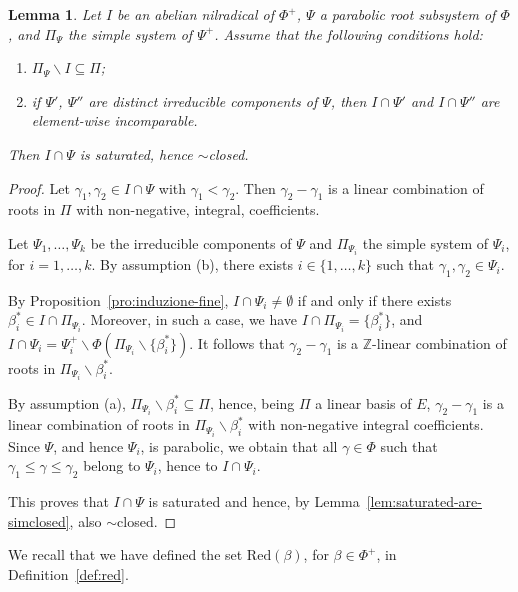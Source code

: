 \documentclass[10pt]{amsart}
\newtheorem{lem}[thm]{Lemma}
\theoremstyle{definition}
\theoremstyle{remark}
\newcommand\smeno{\smallsetminus}
\newcommand\ganz{\mathbb Z}
\newcommand\be{\beta}
\newcommand\ga{\gamma}
\newcommand\red{\mathrm{Red}}
\renewcommand{\leq}{\leqslant}
\begin{document}
\begin{lem}\label{lem:simclosed-suff-cond}
Let $I$ be an abelian nilradical of $\Phi^+$, $\Psi$ a parabolic root subsystem of $\Phi$, and $\Pi_\Psi$ the simple system of $\Psi^+$.
Assume that the following conditions hold:  
\begin{enumerate}[label=\textup{(\alph*)}]
\item $\Pi_\Psi\smeno I\subseteq \Pi$; 
\item if $\Psi'$, $\Psi''$ are distinct irreducible components of $\Psi$, then $I\cap\Psi'$ and  $I\cap \Psi''$ are element-wise incomparable.
\end{enumerate} 
Then $I\cap \Psi$ is saturated,  hence $\sim$closed. 
\end{lem}

\begin{proof}
Let $\ga_1, \ga_2\in I\cap \Psi$ with $\ga_1< \ga_2$.
Then   $\ga_2-\ga_1$ is a linear combination of roots in $\Pi$ with non-negative, integral, coefficients. 

\par
Let $\Psi_1, \dots, \Psi_k$ be the irreducible components of $\Psi$ and $\Pi_{\Psi_i}$ the simple system of $\Psi_i$, for $i=1, \dots, k$. 
By assumption (b), there exists $i\in \{1, \dots, k\}$ such that $\ga_1, \ga_2\in \Psi_i$. 

\par
By Proposition~\ref{pro:induzione-fine}, $I\cap \Psi_i\neq\emptyset$ if and only if there exists $\be_i^*\in I\cap \Pi_{\Psi_i}$. 
Moreover, in such a case, we have $I\cap \Pi_{\Psi_i}=\{\be_i^*\}$, and $I\cap \Psi_i=\Psi_i^+\smeno\Phi(\Pi_{\Psi_i}\smeno\{\be_i^*\})$.
It follows that $\ga_2-\ga_1$ is a $\ganz$-linear combination of roots in $\Pi_{\Psi_i}\smeno {\be_i^*}$. 

\par
By assumption (a), $\Pi_{\Psi_i}\smeno {\be_i^*}\subseteq \Pi$, hence, being $\Pi$ a linear basis of $E$, $\ga_2-\ga_1$ is a linear combination of roots in $\Pi_{\Psi_i}\smeno {\be_i^*}$ with non-negative integral coefficients. 
Since $\Psi$, and hence $\Psi_i$, is parabolic, we obtain that all $\ga\in \Phi$ such that $\ga_1\leq \ga\leq \ga_2$ belong to $\Psi_i$, hence to  $I\cap\Psi_i$. 

\par
This proves that $I\cap \Psi$ is saturated and hence, 
by Lemma~\ref{lem:saturated-are-simclosed}, also $\sim$closed.
\end{proof}

We recall that we have defined the set $\red(\be)$, for  $\be\in \Phi^+$,  in  Definition~\ref{def:red}.
\end{document}
